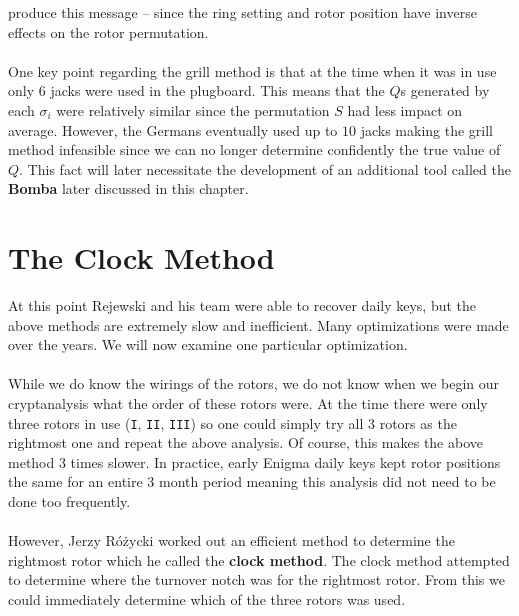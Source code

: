 produce this message -- since the ring setting and rotor position
have inverse effects on the rotor permutation.
\\\\One key point regarding the grill method is that at the time when
it was in use only $6$ jacks were used in the plugboard. This means
that the $Q$s generated by each $\sigma_i$ were relatively similar
since the permutation $S$ had less impact on average. However, the
Germans eventually used up to $10$ jacks making the grill method
infeasible since we can no longer determine confidently the true
value of $Q$. This fact will later necessitate the development of an
additional tool called the {\bf{Bomba}} later discussed in this chapter.

\section{The Clock Method}

At this point Rejewski and his team were able to recover daily keys,
but the above methods are extremely slow and inefficient. Many
optimizations were made over the years. We will now examine one
particular optimization.
\\\\While we do know the wirings of the rotors, we do not know when
we begin our cryptanalysis what the order of these rotors were. At
the time there were only three rotors in use (\texttt{I},
\texttt{II}, \texttt{III}) so one could simply try all 3 rotors as
the rightmost one and repeat the above analysis. Of course, this
makes the above method 3 times slower. In practice, early Enigma
daily keys kept rotor positions the same for an entire 3 month period
meaning this analysis did not need to be done too frequently.
\\\\However, Jerzy Różycki worked out an efficient method to
determine the rightmost rotor which he called the {\bf{clock
method}}. The clock method attempted to determine where the turnover
notch was for the rightmost rotor. From this we could immediately
determine which of the three rotors was used.

